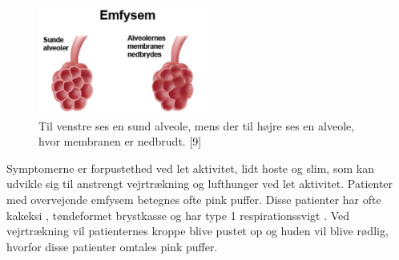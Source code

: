 \begin{figure} [H]
\centering
\includegraphics[width=0.5\textwidth]{figures/emfysem}
\caption{Til venstre ses en sund alveole, mens der til højre ses en alveole, hvor membranen er nedbrudt.  [9]}
\label{fig:emfysem}
\end{figure} 

\noindent
Symptomerne er forpustethed ved let aktivitet, lidt hoste og slim, som kan udvikle sig til anstrengt vejrtrækning og lufthunger ved let aktivitet. Patienter med overvejende emfysem betegnes ofte pink puffer. Disse patienter har ofte kakeksi , tøndeformet brystkasse og har type 1 respirationssvigt . Ved vejrtrækning vil patienternes kroppe blive pustet op og huden vil blive rødlig, hvorfor disse patienter omtales pink puffer.\cite{Healthguidances2016}


